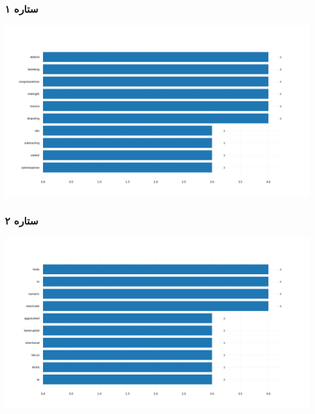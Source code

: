 {{\subsubsection{\Large ۱ ستاره}
{ \setLR
\begin{center}
\includegraphics[scale=0.4]{Images/uncom_words_1star.png}
\end{center}
\begin{adjustbox}{width=\textwidth}
\end{adjustbox}
}
\subsubsection{\Large ۲ ستاره}
{ \setLR
\begin{center}
\includegraphics[scale=0.4]{Images/uncom_words_2star.png}
\end{center}
\begin{adjustbox}{width=\textwidth}
\end{adjustbox}
}
}}

